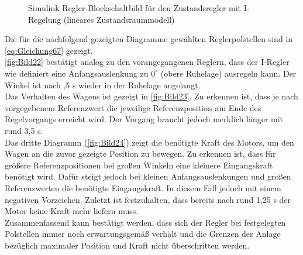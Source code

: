 \begin{figure}[H]
    \centering
    \caption[Regler mit I-Regelung Simulink (linear)]{Simulink Regler-Blockschaltbild für den Zustandsregler mit I-Regelung (lineares Zustandsraummodell)}
    \label{fig:Bild21}
\end{figure}

Die für die nachfolgend gezeigten Diagramme gewählten Reglerpolstellen sind in \autoref{eq:Gleichung67} gezeigt. \\
\newline
\autoref{fig:Bild22} bestätigt analog zu den vorangegangenen Reglern, dass der I-Regler wie definiert eine Anfangsauslenkung zu $0^\circ$ (obere Ruhelage) ausregeln kann. Der Winkel ist nach ,5 s wieder in der Ruhelage angelangt. \\
\newline
Das Verhalten des Wagens ist gezeigt in \autoref{fig:Bild23}. Zu erkennen ist, dass je nach vorgegebenem Referenzwert die jeweilige Referenzposition am Ende des Regelvorgangs erreicht wird. Der Vorgang braucht jedoch merklich länger mit rund 3,5 s. \\
\newline
Das dritte Diagramm (\autoref{fig:Bild24}) zeigt die benötigte Kraft des Motors, um den Wagen an die zuvor gezeigte Position zu bewegen. Zu erkennen ist, dass für größere Referenzpositionen bei großen Winkeln eine kleinere Eingangskraft benötigt wird. Dafür steigt jedoch bei kleinen Anfangsauslenkungen und großen Referenzwerten die benötigte Eingangskraft. In diesem Fall jedoch mit einem negativen Vorzeichen. Zuletzt ist festzuhalten, dass bereits nach rund 1,25 s der Motor keine Kraft mehr liefern muss.\\
\newline
Zusammenfassend kann bestätigt werden, dass sich der Regler bei festgelegten Polstellen immer noch erwartungsgemäß verhält und die Grenzen der Anlage bezüglich maximaler Position und Kraft nicht überschritten werden.

